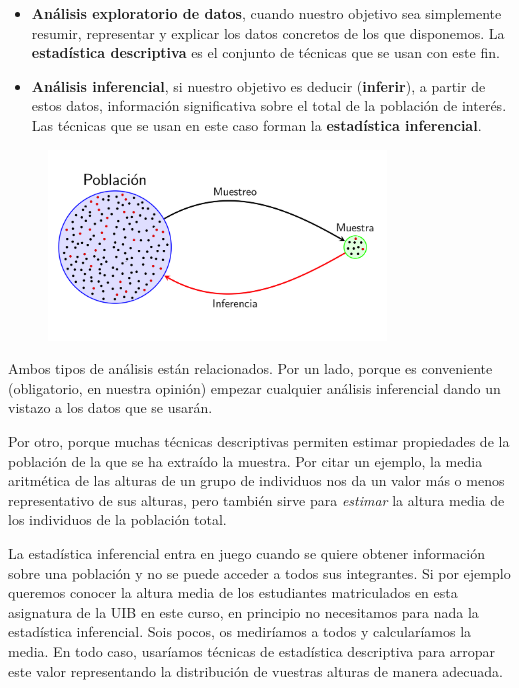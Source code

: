 \documentclass[
  letterpaper,
  DIV=11,
  numbers=noendperiod]{scrreprt}
\begin{document}
\begin{itemize}
\item
  \textbf{Análisis exploratorio de datos}, cuando nuestro objetivo sea
  simplemente resumir, representar y explicar los datos concretos de los
  que disponemos. La \textbf{estadística descriptiva} es el conjunto de
  técnicas que se usan con este fin.
\item
  \textbf{Análisis inferencial}, si nuestro objetivo es deducir
  (\textbf{inferir}), a partir de estos datos, información significativa
  sobre el total de la población de interés. Las técnicas que se usan en
  este caso forman la \textbf{estadística inferencial}.
\end{itemize}

\begin{figure}

{\centering \includegraphics[width=0.8\textwidth,height=\textheight]{Figuras/EstInf.png}

}

\end{figure}

Ambos tipos de análisis están relacionados. Por un lado, porque es
conveniente (obligatorio, en nuestra opinión) empezar cualquier análisis
inferencial dando un vistazo a los datos que se usarán.

Por otro, porque muchas técnicas descriptivas permiten estimar
propiedades de la población de la que se ha extraído la muestra. Por
citar un ejemplo, la media aritmética de las alturas de un grupo de
individuos nos da un valor más o menos representativo de sus alturas,
pero también sirve para \emph{estimar} la altura media de los individuos
de la población total.

La estadística inferencial entra en juego cuando se quiere obtener
información sobre una población y no se puede acceder a todos sus
integrantes. Si por ejemplo queremos conocer la altura media de los
estudiantes matriculados en esta asignatura de la UIB en este curso, en
principio no necesitamos para nada la estadística inferencial. Sois
pocos, os mediríamos a todos y calcularíamos la media. En todo caso,
usaríamos técnicas de estadística descriptiva para arropar este valor
representando la distribución de vuestras alturas de manera adecuada.
\end{document}
